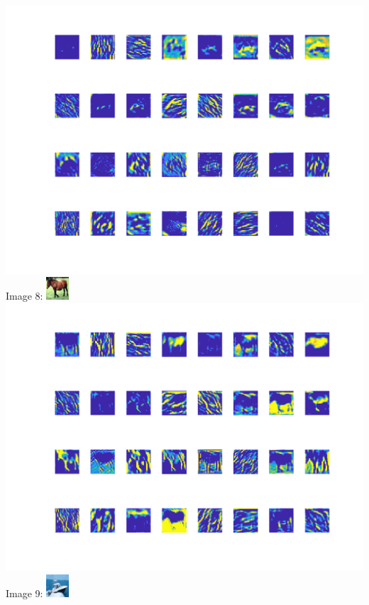 \documentclass[10pt]{article}
\begin{document}
\includegraphics[scale=0.65]{7_filter_res}\\
\newpage
Image 8:
\includegraphics{8}\\
\includegraphics[scale=0.65]{8_filter_res}\\
Image 9:
\includegraphics{9}\\
\end{document}
